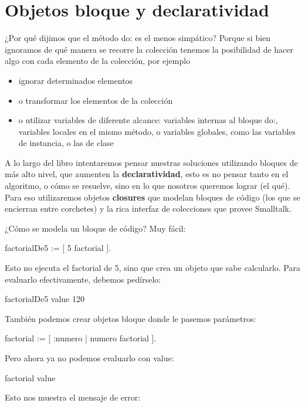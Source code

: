 \documentclass[a4paper,12pt]{book}
\begin{document}
\section{Objetos bloque y declaratividad}
¿Por qué dijimos que el método do: es el menos simpático? Porque si bien ignoramos de qué manera se recorre la
colección tenemos la posibilidad de hacer algo con cada elemento de la colección, por ejemplo
\begin{itemize}
 \item ignorar determinados elementos
 \item o transformar los elementos de la colección
 \item o utilizar variables de diferente alcance: variables internas al bloque do:, variables locales en el mismo
 método, o variables globales, como las variables de instancia, o las de clase
\end{itemize}
A lo largo del libro intentaremos pensar nuestras soluciones utilizando bloques de más alto nivel, que aumenten
la \textbf{declaratividad}, esto es no pensar tanto en el algoritmo, o cómo se resuelve, sino en lo que nosotros
queremos lograr (el qué). Para eso utilizaremos objetos \textbf{closures} que modelan bloques de código 
(los que se encierran entre corchetes) y la rica interfaz de colecciones que provee Smalltalk.

¿Cómo se modela un bloque de código? Muy fácil:

\begin{code}
factorialDe5 := [ 5 factorial ].
\end{code}

Esto no ejecuta el factorial de 5, sino que crea un objeto que sabe calcularlo. Para evaluarlo efectivamente, 
debemos pedírselo:

\begin{code}
factorialDe5 value
    120
\end{code}

También podemos crear objetos bloque donde le pasemos parámetros:

\begin{code}
factorial := [ :numero | numero factorial ].
\end{code}

Pero ahora ya no podemos evaluarlo con value:

\begin{code}
factorial value
\end{code}

Esto nos muestra el mensaje de error:
\end{document}
